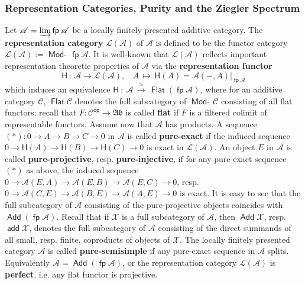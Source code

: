 \documentclass[oneside, a4paper,reqno]{amsart}
\numberwithin{equation}{section}
\theoremstyle{definition}
\begin{document}
\subsubsection{Representation Categories, Purity and the Ziegler Spectrum} Let ${\mathscr A} = \operatorname*{\varinjlim} \operatorname*{\mathsf{fp}}{\mathscr A}$ be a
locally finitely presented additive category. The {\bf
representation category} $\mathcal L({\mathscr A})$ of ${\mathscr A}$ is defined to be
the functor category $\mathcal L({\mathscr A}) := \operatorname*{\mathsf{Mod}-\!}\operatorname*{\mathsf{fp}}{\mathscr A}$. It is well-known
that $\mathcal L({\mathscr A})$ reflects important representation theoretic
properties of ${\mathscr A}$ via the {\bf representation functor}
\[
\mathsf{H} \, : \, {\mathscr A} {\longrightarrow} \mathcal L({\mathscr A}), \,\,\,\,\ A \,
\longmapsto \, \mathsf{H}(A) = {\mathscr A}(-,A)|_{\operatorname*{\mathsf{fp}}{\mathscr A}}
\]
which induces an equivalence $\mathsf{H} \ : \ {\mathscr A} \,
\stackrel{\approx}{\longrightarrow}\, \operatorname*{\mathsf{Flat}}(\operatorname*{\mathsf{fp}}{\mathscr A})$, where for an additive
category ${\mathscr C}$, $\operatorname*{\mathsf{Flat}}{\mathscr C}$ denotes the full subcategory of $\operatorname*{\mathsf{Mod}-\!}{\mathscr C}$
consisting of all flat functors; recall that $F \colon
{\mathscr C}^\operatorname*{\mathsf{op}} {\longrightarrow} {\mathfrak{Ab}}$ is called {\bf flat} if $F$ is a filtered colimit of
representable functors. Assume now that ${\mathscr A}$ has products. A
sequence $(*): 0{\longrightarrow} A {\longrightarrow} B {\longrightarrow} C {\longrightarrow} 0$ in ${\mathscr A}$ is called {\bf
pure-exact} if the induced sequence $0{\longrightarrow} \mathsf{H}(A) {\longrightarrow}
\mathsf{H}(B) {\longrightarrow} \mathsf{H}(C) {\longrightarrow} 0$ is exact in $\mathcal
L({\mathscr A})$. An object $E$ in ${\mathscr A}$ is called {\bf pure-projective}, resp.
{\bf pure-injective}, if for any pure-exact sequence $(*)$ as above,
the induced sequence $0 {\longrightarrow} {\mathscr A}(E,A){\longrightarrow} {\mathscr A}(E,B) {\longrightarrow} {\mathscr A}(E,C) {\longrightarrow}
0$, resp. $0 {\longrightarrow} {\mathscr A}(C,E){\longrightarrow} {\mathscr A}(B,E) {\longrightarrow} {\mathscr A}(A,E) {\longrightarrow} 0$ is exact.
It is easy to see that the full subcategory of ${\mathscr A}$ consisting of
the pure-projective objects coincides with $\operatorname*{\mathsf{Add}}(\operatorname*{\mathsf{fp}}{\mathscr A})$. Recall
that if ${\mathcal X}$ is a full subcategory of ${\mathscr A}$, then $\operatorname*{\mathsf{Add}} {\mathcal X}$, resp.
$\operatorname*{\mathsf{add}}{\mathcal X}$, denotes the full subcategory of ${\mathscr A}$ consisting of the
direct summands of all small, resp. finite, coproducts of objects of
${\mathcal X}$. The locally finitely presented category ${\mathscr A}$ is called {\bf
pure-semisimple} if any pure-exact sequence in ${\mathscr A}$ splits.
Equivalently  ${\mathscr A} = \operatorname*{\mathsf{Add}}(\operatorname*{\mathsf{fp}}{\mathscr A})$, or the representation category
$\mathcal L({\mathscr A})$ is {\bf perfect}, i.e. any flat functor is
projective.
\end{document}
